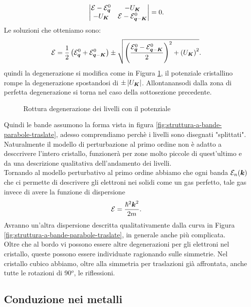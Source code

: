 \[
	\begin{vmatrix}
		\mathcal{E}-\mathcal{E}^0_{\boldsymbol{q}} & -U_{\boldsymbol{K}} \\
		-U_{\boldsymbol{K}} & \mathcal{E}-\mathcal{E}^0_{\boldsymbol{q}-\boldsymbol{K}}
	\end{vmatrix} 
	=
	0
.\] 
Le soluzioni che otteniamo sono:
\[\begin{aligned}
	\mathcal{E}  = \frac{1}{2}\left( \mathcal{E}^0_{\boldsymbol{q}} 
		+ 
	\mathcal{E}^0_{\boldsymbol{q}-\boldsymbol{K}} \right) 
	\pm
	\sqrt{\left( 
	\frac{\mathcal{E}^0_{\boldsymbol{q}}-\mathcal{E}^0_{\boldsymbol{q}-\boldsymbol{K}}}{2} \right) ^2
		+ 
	\left( U_{\boldsymbol{K}} \right)^2} 
.\end{aligned}\]
quindi la degenerazione si modifica come in Figura  \ref{fig:rottura-degenerazione-dei-livelli-con-il-potenziale}, il potenziale cristallino rompe la degenerazione spostandosi di $ \pm \left| U_{\boldsymbol{K}} \right|$. Allontanansodi dalla zona di perfetta degenerazione si torna nel caso della sottosezione precedente.
\begin{figure}[ht]
    \centering
    \caption{Rottura degenerazione dei livelli con il potenziale}
    \label{fig:rottura-degenerazione-dei-livelli-con-il-potenziale}
\end{figure}
Quindi le bande assumono la forma vista in figura \ref{fig:struttura-a-bande-parabole-traslate}, adesso comprendiamo perchè i livelli sono disegnati "splittati".\\
Naturalmente il modello di perturbazione al primo ordine non è adatto a desccrivere l'intero cristallo, funzionerà per zone molto piccole di quest'ultimo e da una descrizione qualitativa dell'andamento dei livelli.\\
Tornando al modello perturbativo al primo ordine abbiamo che ogni banda $\mathcal{E}_n(\boldsymbol{k})$ che ci permette di descrivere gli elettroni nei solidi come un gas perfetto, tale gas invece di avere la funzione di dispersione 
\[
	\mathcal{E}  = \frac{\hbar ^2 \boldsymbol{k}^2}{2m}
.\] 
Avranno un'altra dispersione descritta qualitativamente dalla curva in Figura \ref{fig:struttura-a-bande-parabole-traslate}, in generale anche più complicata. \\
Oltre che al bordo vi possono essere altre degenerazioni per gli elettroni nel cristallo, queste possono essere individuate ragionando sulle simmetrie. Nel cristallo cubico abbiamo, oltre alla simmetria per traslazioni già affrontata, anche tutte le rotazioni di 90$^o$, le riflessioni. \\
\subsection{Conduzione nei metalli}
\label{subsec:Conduzione nei metalli}
